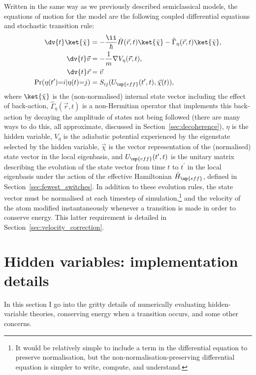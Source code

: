 Written in the same way as we previously described semiclassical models, the equations of motion for the model are the following coupled differential equations and stochastic transition rule:
\begin{align}\label{eq:eq:hvsc_semiclassical_simple_first}
\dv{t}\ket{\tilde\chi} &= -\frac\ii\hbar \hat H(\vec r, t)\ket{\tilde\chi} - \hat\Gamma_\eta(\vec r, t)\ket{\tilde\chi},\\
\dv{t}\vec v &= -\frac1m\nabla V_\eta(\vec r, t),\\
\dv{t}\vec r &= \vec v\\
\Pr(\eta(t^\prime){=}i|\eta(t){=}j) &= S_{ij}(U_\up{eff}(t^\prime, t), \vec\chi(t)),
\label{eq:hvsc_semiclassical_simple_last}
\end{align}
where $\ket{\tilde\chi}$ is the (non-normalised) internal state vector including the effect of back-action, $\hat\Gamma_\eta(\vec r, t)$ is a non-Hermitian operator that implements this back-action by decaying the amplitude of states not being followed (there are many ways to do this, all approximate, discussed in Section~\ref{sec:decoherence}), $\eta$ is the hidden variable, $V_\eta$ is the adiabatic potential experienced by the eigenstate selected by the hidden variable, $\vec\chi$ is the vector representation of the (normalised) state vector in the local eigenbasis, and $U_\up{eff}(t^\prime, t)$ is the unitary matrix describing the evolution of the state vector from time $t$ to $t^\prime$ in the local eigenbasis under the action of the effective Hamiltonian $\hat H_\up{eff}$, defined in Section~\ref{sec:fewest_switches}. In addition to these evolution rules, the state vector must be normalised at each timestep of simulation,\footnote{It would be relatively simple to include a term in the differential equation to preserve normalisation, but the non-normalisation-preserving differential equation is simpler to write, compute, and understand.} and the velocity of the atom modified instantaneously whenever a transition is made in order to conserve energy. This latter requirement is detailed in Section~\ref{sec:velocity_correction}.

\section{Hidden variables: implementation details}\label{sec:implementation_details}

In this section I go into the gritty details of numerically evaluating hidden-variable theories, conserving energy when a transition occurs, and some other concerns.

